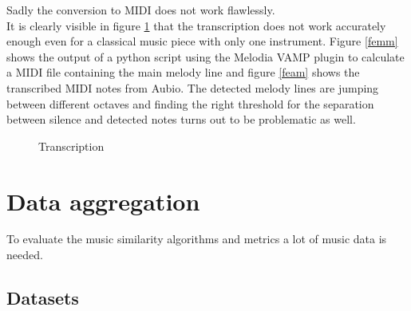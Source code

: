 Sadly the conversion to MIDI does not work flawlessly.\\
It is clearly visible in figure \ref{fig:transc} that the transcription does not work accurately enough even for a classical music piece with only one instrument. Figure \ref{femm} shows the output of a python script using the Melodia VAMP plugin to calculate a MIDI file containing the main melody line and figure \ref{feam} shows the transcribed MIDI notes from Aubio. The detected melody lines are jumping between different octaves and finding the right threshold for the separation between silence and detected notes turns out to be problematic as well.

\begin{figure}[htbp]
	\centering
	\caption{Transcription}
	\label{fig:transc}
\end{figure}
\FloatBarrier 


\chapter{Data aggregation}\label{data}

To evaluate the music similarity algorithms and metrics a lot of music data is needed.

\section{Datasets}\label{datasets}

